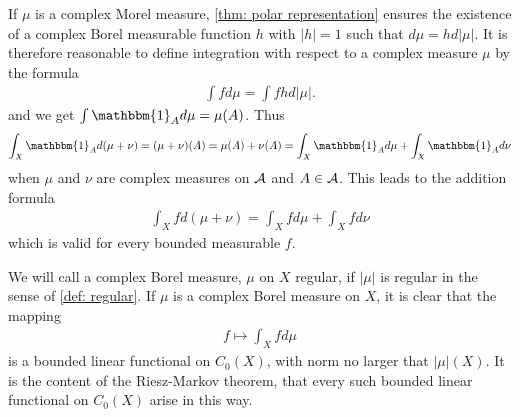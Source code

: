 If $\mu$ is a complex Morel measure, \cref{thm: polar representation} ensures the existence of a complex Borel measurable function $h$ with $|h|=1$ such that $d\mu=hd|\mu|$. It is therefore reasonable to define integration with respect to a complex measure $\mu$ by the formula
\begin{align*}
	\int fd\mu=\int fhd|\mu|.
\end{align*}
and we get $\int \mathbbm{1}_{A}d\mu=\mu(A)$. Thus
\begin{align*}
	\int_{X}\mathbbm{1}_{A}d(\mu+\nu)=(\mu+\nu)(A)=\mu(A)+\nu(A)=\int_{X}\mathbbm{1}_{A}d\mu+\int_{X}\mathbbm{1}_{A}d\nu
\end{align*}
when $\mu$ and $\nu$ are complex measures on $\mathcal{A}$ and $A\in \mathcal{A}$. This leads to the addition formula
\begin{align*}
	\int_{X} fd(\mu+\nu)=\int_{X}fd\mu+\int_{X}fd\nu
\end{align*}
which is valid for every bounded measurable $f$.

We will call a complex Borel measure, $\mu$ on $X$ regular, if $|\mu|$ is regular in the sense of \cref{def: regular}. If $\mu$ is a complex Borel measure on $X$, it is clear that the mapping
\begin{align*}
	f\mapsto \int_{X}fd\mu
\end{align*}
is a bounded linear functional on $C_{0}(X)$, with norm no larger that $|\mu|(X)$.
It is the content of the Riesz-Markov theorem, that every such bounded linear functional on $C_{0}(X)$ arise in this way.


